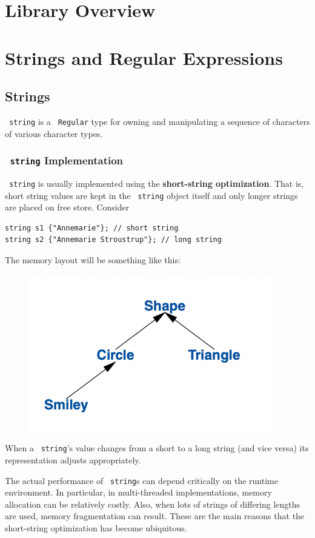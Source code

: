 \documentclass[11pt]{article}
\let\OldTexttt\texttt
\renewcommand{\texttt}[1]{\OldTexttt{\color{MidnightBlue} #1}}
\begin{document}
\section{Library Overview}
\label{sec:org6ee6195}
\section{Strings and Regular Expressions}
\label{sec:orga5a895f}
\subsection{Strings}
\label{sec:org0f6b9ea}
\texttt{string} is a \texttt{Regular} type for owning and manipulating a sequence of characters of various
character types.
\subsubsection{\texttt{string} Implementation}
\label{sec:org377cc60}
\texttt{string} is usually implemented using the \textbf{short-string optimization}. That is, short string values
are kept in the \texttt{string} object itself and only longer strings are placed on free store. Consider
\begin{verbatim}
string s1 {"Annemarie"}; // short string
string s2 {"Annemarie Stroustrup"}; // long string
\end{verbatim}
The memory layout will be something like this:
\begin{figure}[htbp]
\centering
\includegraphics[width=.6\textwidth]{../images/ATourOfC++/3.png}
\label{}
\end{figure}
When a \texttt{string}'s value changes from a short to a long string (and vice versa) its representation
adjusts appropriately.

The actual performance of \texttt{string}s can depend critically on the runtime environment. In
particular, in multi-threaded implementations, memory allocation can be relatively costly. Also,
when lots of strings of differing lengths are used, memory fragmentation can result. These are the
main reasons that the short-string optimization has become ubiquitous.
\end{document}
